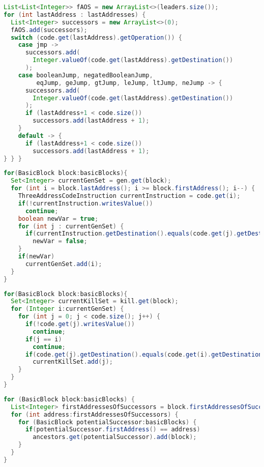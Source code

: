 \begin{lstlisting}[language=Java, caption={Zusammenfassung der toBBList() Methode}, label={cde:bb-successor}]
List<List<Integer>> fAOS = new ArrayList<>(leaders.size());
for (int lastAddress : lastAddresses) {
  List<Integer> successors = new ArrayList<>(0);
  fAOS.add(successors);
  switch (code.get(lastAddress).getOperation()) {
    case jmp -> 
      successors.add(
        Integer.valueOf(code.get(lastAddress).getDestination())
      );
    case booleanJump, negatedBooleanJump, 
         eqJump, geJump, gtJump, leJump, ltJump, neJump -> {
      successors.add(
        Integer.valueOf(code.get(lastAddress).getDestination())
      );
      if (lastAddress+1 < code.size())
        successors.add(lastAddress + 1);
    }
    default -> {
      if (lastAddress+1 < code.size())
        successors.add(lastAddress + 1);
} } }
\end{lstlisting}
\begin{lstlisting}[language=Java, caption={Bestimmmen der gen Menge für erreichende Definitionen}, label={cde:rd_gen}]
for(BasicBlock block:basicBlocks){
  Set<Integer> currentGenSet = gen.get(block);
  for (int i = block.lastAddress(); i >= block.firstAddress(); i--) {
    ThreeAddressCodeInstruction currentInstruction = code.get(i);
    if(!currentInstruction.writesValue())
      continue;
    boolean newVar = true;
    for (int j : currentGenSet) {
      if(currentInstruction.getDestination().equals(code.get(j).getDestination()))
        newVar = false;
    }
    if(newVar)
      currentGenSet.add(i); 
  }
}
\end{lstlisting}

\begin{lstlisting}[language=Java, caption={Bestimmmen der kill Menge für erreichende Definitionen}, label={cde:rd_kill}]
for(BasicBlock block:basicBlocks){
  Set<Integer> currentKillSet = kill.get(block);
  for (Integer i:currentGenSet) {
    for (int j = 0; j < code.size(); j++) {
      if(!code.get(j).writesValue())
        continue;
      if(j == i)
        continue;
      if(code.get(j).getDestination().equals(code.get(i).getDestination()))
        currentKillSet.add(j);
    }
  }
}
\end{lstlisting}

\begin{lstlisting}[language=Java, caption={Bestimmmen der Menge der Vorfahren für erreichende Definitionen}, label={cde:rd_anc}]
for (BasicBlock block:basicBlocks) {
  List<Integer> firstAddressesOfSuccessors = block.firstAddressesOfSuccessors();
  for (int address:firstAddressesOfSuccessors) {
    for (BasicBlock potentialSuccessor:basicBlocks) {
      if(potentialSuccessor.firstAddress() == address)
        ancestors.get(potentialSuccessor).add(block);
    }
  }
}
\end{lstlisting}

